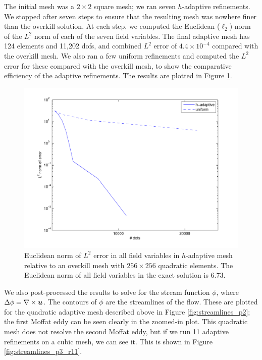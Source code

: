 The initial mesh was a $2 \times 2$ square mesh; we ran seven $h$-adaptive refinements.  We stopped after seven steps to ensure that the resulting mesh was nowhere finer than the overkill solution.  At each step, we computed the Euclidean ($\ell_{2}$) norm of the $L^{2}$ norm of each of the seven field variables.  The final adaptive mesh has 124 elements and 11,202 dofs, and combined $L^{2}$ error of $4.4 \times 10^{-4}$ compared with the overkill mesh.  We also ran a few uniform refinements and computed the $L^{2}$ error for these compared with the overkill mesh, to show the comparative efficiency of the adaptive refinements.  The results are plotted in Figure \ref{fig:adaptive_cavity_flow_quadratic_vs_overkill}.
\begin{figure}[h!b!p!]
\centering
\includegraphics[scale=0.60]{./figures/adaptive_cavity_flow_quadratic_vs_overkill.pdf}
\caption{Euclidean norm of $L^{2}$ error in all field variables in $h$-adaptive mesh relative to an overkill mesh with $256 \times 256$ quadratic elements.  The Euclidean norm of all field variables in the exact solution is 6.73.
}
\label{fig:adaptive_cavity_flow_quadratic_vs_overkill}
\end{figure}

We also post-processed the results to solve for the stream function $\phi$, where $\Delta \phi = \NVRcurl \vect{u}$.  The contours of $\phi$ are the streamlines of the flow.  These are plotted for the quadratic adaptive mesh described above in Figure \ref{fig:streamlines_p2}; the first Moffat eddy can be seen clearly in the zoomed-in plot.  This quadratic mesh does not resolve the second Moffat eddy, but if we run 11 adaptive refinements on a cubic mesh, we can see it.  This is shown in Figure \ref{fig:streamlines_p3_r11}.

